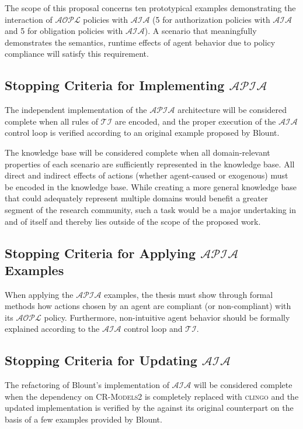 The scope of this proposal concerns ten prototypical examples demonstrating the interaction of $\mathcal{AOPL}$ policies with $\mathcal{AIA}$ (5 for authorization policies with $\mathcal{AIA}$ and 5 for obligation policies with $\mathcal{AIA}$).
A scenario that meaningfully demonstrates the semantics, runtime effects of agent behavior due to policy compliance will satisfy this requirement.

\subsection{Stopping Criteria for Implementing $\mathcal{APIA}$}

The independent implementation of the $\mathcal{APIA}$ architecture will be considered complete when all rules of $\mathcal{TI}$ are encoded, and the proper execution of the $\mathcal{AIA}$ control loop is verified according to an original example proposed by Blount.

The knowledge base will be considered complete when all domain-relevant properties of each scenario are sufficiently represented in the knowledge base.
All direct and indirect effects of actions (whether agent-caused or exogenous) must be encoded in the knowledge base.
While creating a more general knowledge base that could adequately represent multiple domains would benefit a greater segment of the research community, such a task would be a major undertaking in and of itself and thereby lies outside of the scope of the proposed work.

\subsection{Stopping Criteria for Applying $\mathcal{APIA}$ Examples}

When applying the $\mathcal{APIA}$ examples, the thesis must show through formal methods how actions chosen by an agent are compliant (or non-compliant) with its $\mathcal{AOPL}$ policy.
Furthermore, non-intuitive agent behavior should be formally explained according to the $\mathcal{AIA}$ control loop and $\mathcal{TI}$.

\subsection{Stopping Criteria for Updating $\mathcal{AIA}$}

The refactoring of Blount's implementation of $\mathcal{AIA}$ will be considered complete when the dependency on \textsc{CR-Models2} is completely replaced with \textsc{clingo} and the updated implementation is verified by the against its original counterpart on the basis of a few examples provided by Blount.

